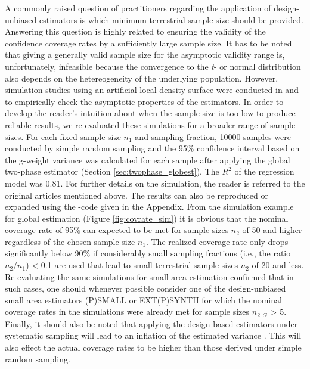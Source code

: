 \documentclass[article]{jss}
\begin{document}
A commonly raised question of practitioners regarding the application of design-unbiased estimators is which minimum terrestrial sample size should be provided. Answering this question is highly related to ensuring the validity of the confidence coverage rates by a sufficiently large sample size. It has to be noted that giving a generally valid sample size for the asymptotic validity range is, unfortunately, infeasible because the convergence to the \textit{t}- or normal distribution also depends on the hetereogeneity of the underlying population. However, simulation studies using an artificial local density surface were conducted in \citet{mandallaz2013a} and \citet{mandallaz2013b} to empirically check the asymptotic properties of the estimators. In order to develop the reader's intuition about when the sample size is too low to produce reliable results, we re-evaluated these simulations for a broader range of sample sizes. For each fixed sample size $n_1$ and sampling fraction, 10000 samples were conducted by simple random sampling and the 95\% confidence interval based on the g-weight variance was calculated for each sample after applying the global two-phase estimator (Section \ref{sec:twophase_globest}). The $R^2$ of the regression model was 0.81. For further details on the simulation, the reader is referred to the original articles mentioned above. The results can also be reproduced or expanded using the -code given in the Appendix. From the simulation example for global estimation (Figure \ref{fig:covrate_sim}) it is obvious that the nominal coverage rate of 95\% can expected to be met for sample sizes $n_2$ of 50 and higher regardless of the chosen sample size $n_1$. The realized coverage rate only drops significantly below 90\% if considerably small sampling fractions (i.e., the ratio ${n_2}/{n_1}$) < 0.1 are used that lead to small terrestrial sample sizes $n_2$ of 20 and less. Re-evaluating the same simulations for small area estimation confirmed that in such cases, one should whenever possible consider one of the design-unbiased small area estimators (P)SMALL or EXT(P)SYNTH for which the nominal coverage rates in the simulations were already met for sample sizes $n_{2,G}$ > 5. Finally, it should also be noted that applying the design-based estimators under systematic sampling will lead to an inflation of the estimated variance \citep{mandallaz1993}. This will also effect the actual coverage rates to be higher than those derived under simple random sampling.
\end{document}
